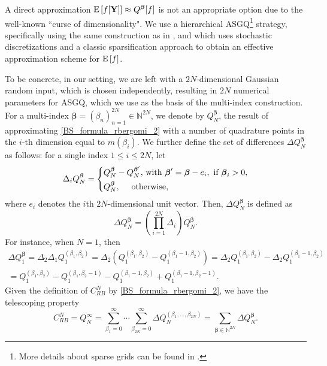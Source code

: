 A direct approximation $\mathrm{E}\left[f[\mathbf{Y}]\right] \approx Q^{\boldsymbol{\beta}}[f]$ is not an appropriate option  due to the well-known ``curse of dimensionality". We use  a hierarchical ASGQ\footnote{More details about sparse grids can be found in \cite{bungartz2004sparse}.} strategy, specifically using the same
construction as in \cite{haji2016multi}, and which uses  stochastic discretizations  and a classic sparsification approach to obtain an effective approximation scheme for $\mathrm{E}\left[f\right]$. 

To be concrete, in our setting, we are left with a $2N$-dimensional Gaussian random input, which is chosen independently, resulting in  $2N$ numerical parameters for ASGQ, which we use as the basis of the multi-index construction. For a multi-index $\boldsymbol{\beta} = (\beta_n)_{n=1}^{2N} \in \mathbb{N}^{2N}$, we denote  by
$Q_N^{\boldsymbol{\beta}}$,   the result of approximating \eqref{BS_formula_rbergomi_2} with a number of quadrature points  in the $i$-th dimension equal to  $m(\beta_i)$. We further define the set of
differences $\Delta Q_N^{\boldsymbol{\beta}}$ as follows: for a single index $1 \le i \le 2N$,
let
\begin{equation*}
\Delta_i Q_N^{\boldsymbol{\beta}} = \left\{ 
\aligned 
 Q_N^{\boldsymbol{\beta}} &- Q_N^{\boldsymbol{\beta}'}  \text{, with } \boldsymbol{\beta}' =\boldsymbol{\beta} - e_i, \text{ if } \boldsymbol{\beta}_i>0 \COMMA \\
 Q_N^{\boldsymbol{\beta}} &, \quad  \text{ otherwise,}
\endaligned
\right.
\end{equation*}
where $e_i$ denotes the $i$th $2N$-dimensional unit vector. Then, $\Delta
Q_N^{\boldsymbol{\beta}}$ is defined as
\begin{equation*}
\Delta Q_N^{\boldsymbol{\beta}} = \left( \prod_{i=1}^{2N} \Delta_i \right) Q_N^{\boldsymbol{\beta}}.
\end{equation*}
For instance, when $N = 1$, then 
\begin{multline*}
	\Delta Q_1^{\boldsymbol{\beta}} = \Delta_2 \Delta_1 Q_1^{(\beta_1, \beta_2)} = \Delta_2\left( Q_1^{(\beta_1,
		\beta_2)} - Q_1^{(\beta_1-1,\beta_2)} \right) = \Delta_2 Q_1^{(\beta_1,
		\beta_2)} - \Delta_2 Q_1^{(\beta_1-1,\beta_2)} 
	\\= Q_1^{(\beta_1, \beta_2)} - Q_1^{(\beta_1, \beta_2-1)} - Q_1^{(\beta_1-1, \beta_2)} + Q_1^{(\beta_1-1, \beta_2-1)}.
\end{multline*}
Given the definition of $C_{RB}^{N}$ by \eqref{BS_formula_rbergomi_2}, we have the telescoping property
\begin{equation*}
C_{RB}^{N}=Q_N^\infty = \sum_{\beta_1=0}^\infty \cdots \sum_{\beta_{2N} = 0}^\infty \Delta
Q_N^{(\beta_1, \ldots, \beta_{2N})} = \sum_{\boldsymbol{\beta} \in \mathbb{N}^{2N}} \Delta Q_N^{\boldsymbol{\beta}}.
\end{equation*}

